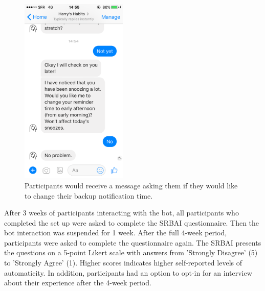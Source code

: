 \begin{figure}[H]
  \centering
  \includegraphics[width=2in]{resources/design/media/4.png}
  \caption{Participants would receive a message asking them if they would like to change their backup notification time.}
  \label{fig:snoozing_too_much}
\end{figure}

After 3 weeks of participants interacting with the bot, all participants who completed the set up were asked to complete the SRBAI questionnaire. Then the bot interaction was suspended for 1 week. After the full 4-week period, participants were asked to complete the questionnaire again. The SRBAI presents the questions on a 5-point Likert scale with answers from 'Strongly Disagree' (5) to 'Strongly Agree' (1). Higher scores indicates higher self-reported levels of automaticity. In addition, participants had an option to opt-in for an interview about their experience after the 4-week period.

